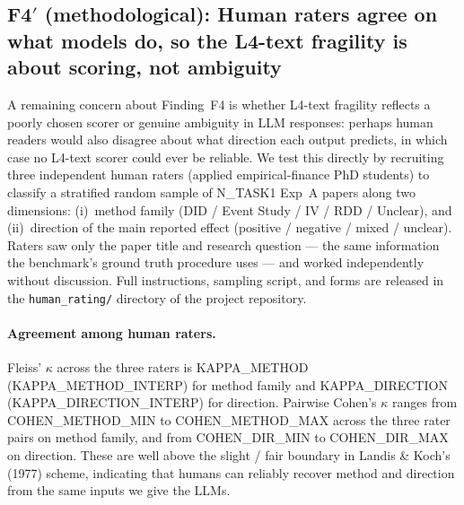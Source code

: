 %
%     

\subsection{F4$'$ (methodological): Human raters agree on what models do,
  so the L4-text fragility is about scoring, not ambiguity}
\label{sec:irr}

A remaining concern about Finding~F4 is whether L4-text fragility reflects
a poorly chosen scorer or genuine ambiguity in LLM responses: perhaps
human readers would also disagree about what direction each output
predicts, in which case no L4-text scorer could ever be reliable. We test
this directly by recruiting three independent human raters (applied
empirical-finance PhD students) to classify a stratified random sample of
{{N_TASK1}} Exp~A papers along two dimensions: (i)~method family
(DID / Event Study / IV / RDD / Unclear), and (ii)~direction of the main
reported effect (positive / negative / mixed / unclear). Raters saw only
the paper title and research question --- the same information the
benchmark's ground truth procedure uses --- and worked independently
without discussion. Full instructions, sampling script, and forms are
released in the \texttt{human\_rating/} directory of the project
repository.

\paragraph{Agreement among human raters.}
Fleiss' $\kappa$ across the three raters is {{KAPPA_METHOD}}
({{KAPPA_METHOD_INTERP}}) for method family and {{KAPPA_DIRECTION}}
({{KAPPA_DIRECTION_INTERP}}) for direction. Pairwise Cohen's $\kappa$
ranges from {{COHEN_METHOD_MIN}} to {{COHEN_METHOD_MAX}} across the
three rater pairs on method family, and from {{COHEN_DIR_MIN}} to
{{COHEN_DIR_MAX}} on direction. These are well above the slight / fair
boundary in Landis \& Koch's (1977) scheme, indicating that humans can
reliably recover method and direction from the same inputs we give the
LLMs.

